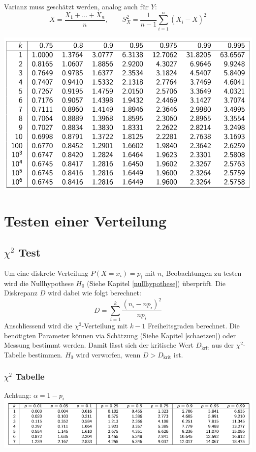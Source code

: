 Varianz muss geschätzt werden, analog auch für $Y$:
\[
\overline{X} = \frac{X_1 + \dots + X_n}{n}, \qquad S^2_X = \frac{1}{n-1}\sum_{i=1}^{n}(X_i - \overline{X})^2
\]


\includegraphics[width=\columnwidth]{Images/t-tabelle}


\section{Testen einer Verteilung}
\subsection{$\chi^2$ Test}
Um eine diskrete Verteilung $P(X = x_i) = p_i$ mit $n_i$ Beobachtungen zu testen wird die Nullhypothese $H_0$ (Siehe Kapitel \ref{nullhypothese}) überprüft. Die Diskrepanz $D$ wird dabei wie folgt berechnet:
\[
D = \sum_{i=1}^{k}\frac{(n_i - np_i)^2}{np_i}
\]
Anschliessend wird die $\chi^2$-Verteilung mit $k-1$ Freiheitsgraden berechnet. Die benötigten Parameter können via Schätzung (Siehe Kapitel \ref{schaetzen}) oder Messung bestimmt werden. Damit lässt sich der kritische Wert $D_\text{krit}$ aus der $\chi^2$-Tabelle bestimmen. $H_0$ wird verworfen, wenn $D > D_\text{krit}$ ist.

\subsubsection{$\chi^2$ Tabelle}
Achtung: $\alpha = 1 - p_i$\\
\includegraphics[width=\columnwidth]{Images/chi-tabelle}

